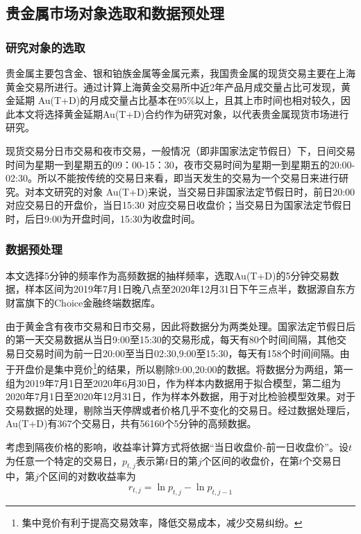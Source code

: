 \documentclass[UTF8,a4paper,12pt]{ctexart}  %
\begin{document}
\hypertarget{section-6}{%
\subsection{贵金属市场对象选取和数据预处理}\label{section-6}}

\hypertarget{section-7}{%
\subsubsection{研究对象的选取}\label{section-7}}

贵金属主要包含金、银和铂族金属等金属元素，我国贵金属的现货交易主要在上海黄金交易所进行。通过计算上海黄金交易所中近2年产品月成交量占比可发现，黄金延期
Au(T+D)的月成交量占比基本在95\%以上，且其上市时间也相对较久，因此本文将选择黄金延期Au(T+D)合约作为研究对象，以代表贵金属现货市场进行研究。

现货交易分日市交易和夜市交易，一般情况（即非国家法定节假日）下，日间交易时间为星期一到星期五的09：00-15：30，夜市交易时间为星期一到星期五的20:00-02:30。所以不能按传统的交易日来看，即当天发生的交易为一个交易日来进行研究。对本文研究的对象
Au(T+D)来说，当交易日非国家法定节假日时，前日20:00对应交易日的开盘价，当日15:30
对应交易日收盘价；当交易日为国家法定节假日时，后日9:00为开盘时间，15:30为收盘时间。

\hypertarget{section-8}{%
\subsubsection{数据预处理}\label{section-8}}

本文选择5分钟的频率作为高频数据的抽样频率，选取Au(T+D)的5分钟交易数据，样本区间为2019年7月1日晚八点至2020年12月31日下午三点半，数据源自东方财富旗下的Choice金融终端数据库。

由于黄金含有夜市交易和日市交易，因此将数据分为两类处理。国家法定节假日后的第一天交易数据从当日9:00至15:30的交易形成，每天有80个时间间隔，其他交易日交易时间为前一日20:00至当日02:30,9:00至15:30，每天有158个时间间隔。由于开盘价是集中竞价\footnote{集中竞价有利于提高交易效率，降低交易成本，减少交易纠纷。}的结果，所以剔除9:00,20:00的数据。将数据分为两组，第一组为2019年7月1日至2020年6月30日，作为样本内数据用于拟合模型，第二组为2020年7月1日至2020年12月31日，作为样本外数据，用于对比检验模型效果。对于交易数据的处理，剔除当天停牌或者价格几乎不变化的交易日。经过数据处理后，Au(T+D)有367个交易日，共有56160个5分钟的高频数据。

考虑到隔夜价格的影响，收益率计算方式将依据``当日收盘价-前一日收盘价''。设\(t\)为任意一个特定的交易日，\(p_{t,j}\)表示第\(t\)日的第\(j\)个区间的收盘价，在第\(t\)个交易日中，第\(j\)个区间的对数收益率为\protect\hypertarget{eq:rt}{}{\begin{equation}r_{t, j}=\ln p_{t, j}-\ln p_{t, j-1}\label{eq:rt}\end{equation}}
\end{document}
